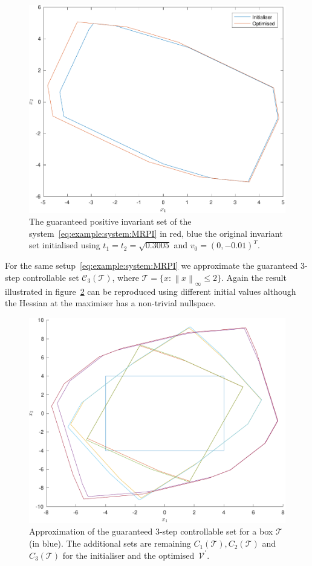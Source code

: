 \documentclass{ifacconf}
\providecommand{\norm}[1]{\left\|#1\right\|}
\providecommand{\C}{\mathcal C}
\providecommand{\V}{\mathcal V}
\providecommand{\T}{\mathcal T}
\begin{document}
\begin{figure}
\includegraphics[width=.95\linewidth]{MRPIsetOptimised.pdf}
\caption{The guaranteed positive invariant set of the system~\eqref{eq:example:system:MRPI} in red, blue the original invariant set initialised using $t_1=t_2=\sqrt{0.3005}$ and $v_0 = (0,-0.01)^T$.}
\label{fig:MRPI:optimised}
\end{figure}


For the same setup~\eqref{eq:example:system:MRPI} we approximate the guaranteed 3-step controllable set $\C_3(\T)$, where $\T=\{x:\norm{x}_\infty\leq 2\}$.
%
Again the result illustrated in figure~\ref{fig:n:step:controllable:set} can be reproduced using different initial values although the Hessian at the maximiser has a non-trivial nullspace.
%

\begin{figure}
\includegraphics[width=.95\linewidth]{NStepSetOptimised.pdf}
\caption{Approximation of the guaranteed 3-step controllable set for a box $\T$ (in blue). The additional sets are remaining $C_1(\T),C_2(\T)$ and $C_3(\T)$ for the initialiser and the optimised~$\V^\prime$.}
\label{fig:n:step:controllable:set}
\end{figure}
\end{document}
